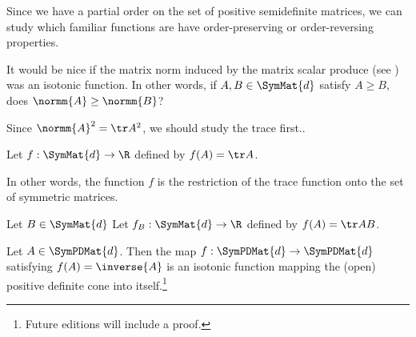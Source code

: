 

Since we have a partial order on the set of positive semidefinite matrices, we can study which familiar functions are have order-preserving or order-reversing properties.


It would be nice if the matrix norm induced by the matrix scalar produce (see ) was an isotonic function.
In other words, if $A, B \in \SymMat{d}$ satisfy $A \geq B$, does $\normm{A} \geq \normm{B}$?

Since $\normm{A}^2 = \tr A^2$, we should study the trace first..


\begin{proposition}
	Let $f: \SymMat{d} \to \R$ defined by $f(A) = \tr A$.
\end{proposition}

In other words, the function $f$ is the restriction of the trace function onto the set of symmetric matrices.

\begin{proposition}
	Let $B \in \SymMat{d}$
	Let $f_B: \SymMat{d} \to \R$ defined by $f(A) = \tr AB$.
\end{proposition}


\begin{proposition}
    Let $A \in \SymPDMat{d}$.
    Then the map $f: \SymPDMat{d} \to \SymPDMat{d}$ satisfying $f(A) = \inverse{A}$ is an isotonic function mapping the (open) positive definite cone into itself.\footnote{Future editions will include a proof.}
\end{proposition}

\blankpage

